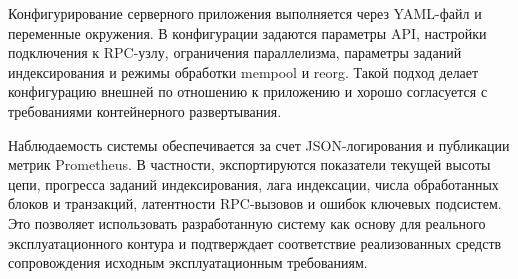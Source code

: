 Конфигурирование серверного приложения выполняется через YAML-файл и переменные окружения.
В конфигурации задаются параметры API, настройки подключения к RPC-узлу,
ограничения параллелизма, параметры заданий индексирования и режимы обработки mempool и reorg.
Такой подход делает конфигурацию внешней по отношению к приложению и хорошо
согласуется с требованиями контейнерного развертывания.

Наблюдаемость системы обеспечивается за счет JSON-логирования и публикации
метрик Prometheus. В частности, экспортируются показатели текущей высоты цепи,
прогресса заданий индексирования, лага индексации, числа обработанных блоков и транзакций,
латентности RPC-вызовов и ошибок ключевых подсистем. Это позволяет использовать
разработанную систему как основу для реального эксплуатационного контура и
подтверждает соответствие реализованных средств сопровождения исходным
эксплуатационным требованиям.
